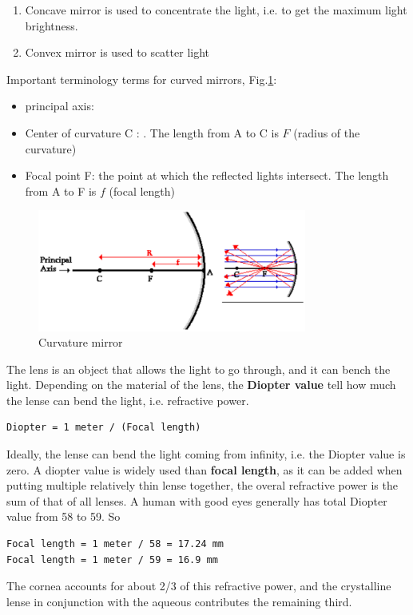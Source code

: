 \begin{enumerate}
  \item Concave mirror is used to concentrate the light, i.e. to get the maximum
  light brightness. 
  \item Convex mirror is used to scatter light  
\end{enumerate}
Important terminology terms for curved mirrors, Fig.\ref{fig:light_curvature}: 
\begin{itemize}
  \item principal axis:
  \item Center of curvature C : . The length from A to C is $F$ (radius of the
  curvature)
  \item Focal point F: the point at which the reflected lights intersect. The
  length from A to F is $f$ (focal length)
\end{itemize}

\begin{figure}[hbt]
  \centerline{\includegraphics[height=4cm,
    angle=0]{./images/light_curvature.eps}}    
\caption{Curvature mirror}
\label{fig:light_curvature}
\end{figure}

The lens is an object that allows the light to go through, and it can bench the
light. Depending on the material of the lens, the {\bf Diopter value} tell how
much the lense can bend the light, i.e. refractive power.
\begin{verbatim}
Diopter = 1 meter / (Focal length)
\end{verbatim}
Ideally, the lense can
bend the light coming from infinity, i.e. the Diopter value is zero. 
A diopter value is widely used than {\bf focal length}, as it can be added when
putting multiple relatively thin lense together, the overal refractive power is
the sum of that of all lenses. A human with good eyes generally has total
Diopter value from 58 to 59. So
\begin{verbatim}
Focal length = 1 meter / 58 = 17.24 mm
Focal length = 1 meter / 59 = 16.9 mm
\end{verbatim}
The cornea accounts for about 2/3 of this refractive power, and the crystalline
lense in conjunction with the aqueous contributes the remaining third. 


